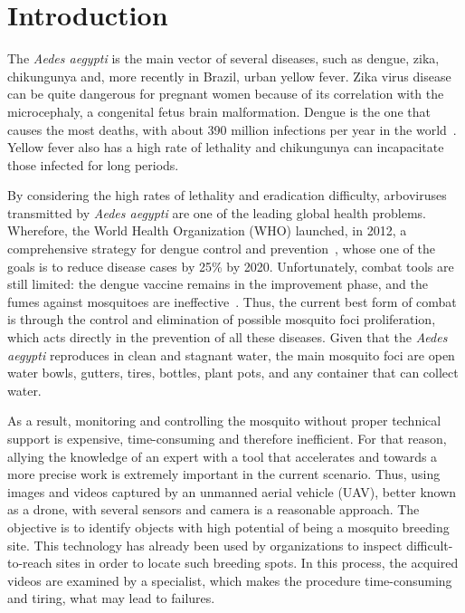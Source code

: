 \chapter{Introduction}
\label{chap:intro}

The \emph{Aedes aegypti} is the main vector of several diseases, such as dengue, zika, chikungunya and, more recently in Brazil, urban yellow fever. 
Zika virus disease can be quite dangerous for pregnant women because of its correlation with the microcephaly, a congenital fetus brain malformation.
Dengue is the one that causes the most deaths, with about 390 million infections per year in the world~\cite{bhatt2013global}.
Yellow fever also has a high rate of lethality and chikungunya can incapacitate those infected for long periods.

By considering the high rates of lethality and eradication difficulty, arboviruses transmitted by \emph{Aedes aegypti} are one of the leading global health problems.
Wherefore, the World Health Organization (WHO) launched, in 2012, a comprehensive strategy for dengue control and prevention~\cite{world2012global}, whose one of the goals is to reduce disease cases by 25\% by 2020. 
Unfortunately, combat tools are still limited: the dengue vaccine remains in the improvement phase, and the fumes against mosquitoes are ineffective~\cite{newton1992model}. 
Thus, the current best form of combat is through the control and elimination of possible mosquito foci proliferation, which acts directly in the prevention of all these diseases. 
Given that the \emph{Aedes aegypti} reproduces in clean and stagnant water, the main mosquito foci are open water bowls, gutters, tires, bottles, plant pots, and any container that can collect water. 


As a result, monitoring and controlling the mosquito without proper technical support is expensive, time-consuming and therefore inefficient. 
For that reason, allying the knowledge of an expert with a tool that accelerates and towards a more precise work is extremely important in the current scenario. 
Thus, using images and videos captured by an unmanned aerial vehicle (UAV), better known as a drone, with several sensors and camera is a reasonable approach.
The objective is to identify objects with high potential of being a mosquito breeding site.
This technology has already been used by organizations to inspect difficult-to-reach sites in order to locate such breeding spots.
In this process, the acquired videos are examined by a specialist, which makes the procedure time-consuming and tiring, what may lead to failures.

